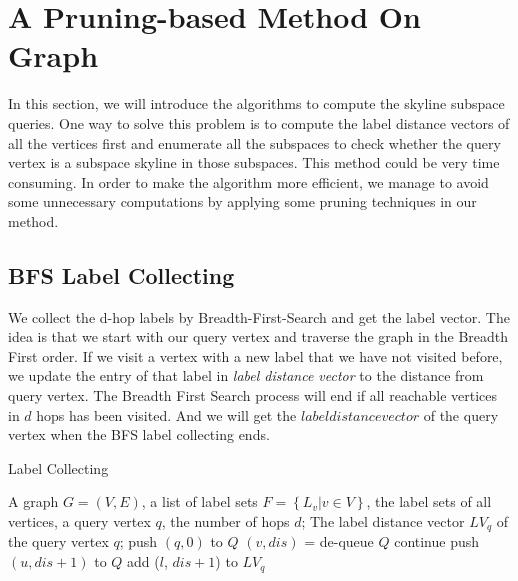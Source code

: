 
%
%

\chapter{A Pruning-based Method On Graph}
\label{ch:graph}

In this section, we will introduce the algorithms to compute the skyline subspace queries. One way to solve this problem is to compute the label distance vectors of all the vertices first and enumerate all the subspaces to check whether the query vertex is a subspace skyline in those subspaces. This method could be very time consuming. In order to make the algorithm more efficient, we manage to avoid some unnecessary computations by applying some pruning techniques in our method.

\section{BFS Label Collecting}
\label{sec:bfs-collect}
We collect the d-hop labels by Breadth-First-Search and get the label vector. The idea is that we start with our query vertex and traverse the graph in the Breadth First order. If we visit a vertex with a new label that we have not visited before, we update the entry of that label in \emph{label distance vector} to the distance from query vertex. The Breadth First Search process will end if all reachable vertices in $d$ hops has been visited. And we will get the $label distance vector$ of the query vertex when the BFS label collecting ends.

\begin{algorithm}[H]
  \caption{Label Collecting}\label{algo:blah}
  \begin{algorithmic}[1]
  \show\LOOP
    \REQUIRE A graph $G=(V,E)$, a list of label sets $F=\left\{L_v | v \in V\right\}$, the label sets of all vertices, a query vertex $q$, the number of hops $d$;
    \ENSURE The label distance vector $LV_q$ of the query vertex $q$;
    \STATE push $\left(q, 0\right)$ to $Q$
        \STATE $\left( v, dis\right)$ = de-queue $Q$
            \STATE continue
        \ENDIF
            \STATE push $\left(u, dis+1\right)$ to $Q$
                    \STATE add ($l$, $dis+1$) to $LV_q$
                \ENDIF
            \ENDFOR
        \ENDFOR
    \ENDWHILE
  \end{algorithmic}
\end{algorithm}

